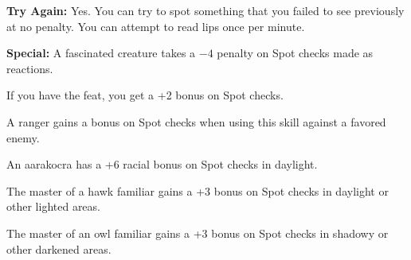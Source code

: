 \textbf{Try Again:} Yes. You can try to spot something that you failed to see previously at no penalty. You can attempt to read lips once per minute.

\textbf{Special:} A fascinated creature takes a $-4$ penalty on Spot checks made as reactions.

If you have the  feat, you get a +2 bonus on Spot checks.

A ranger gains a bonus on Spot checks when using this skill against a favored enemy.

An aarakocra has a +6 racial bonus on Spot checks in daylight.



The master of a hawk familiar gains a +3 bonus on Spot checks in daylight or other lighted areas.

The master of an owl familiar gains a +3 bonus on Spot checks in shadowy or other darkened areas.

